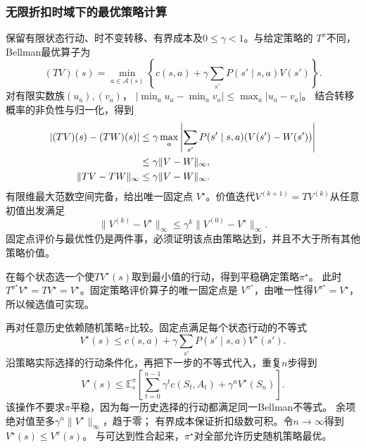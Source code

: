 \subsubsection{无限折扣时域下的最优策略计算}

保留有限状态行动、时不变转移、有界成本及$0\leq\gamma<1$。与给定策略的
$T^\pi$不同，Bellman最优算子为
\begin{equation}
  (TV)(s)=\min_{a\in\mathcal A(s)}
    \left\{c(s,a)+\gamma\sum_{s'}P(s'\mid s,a)V(s')\right\}.
  \label{eq:decision-discounted-bellman-operator}
\end{equation}
对有限实数族$(u_a),(v_a)$，
$|\min_a u_a-\min_a v_a|\leq\max_a|u_a-v_a|$。
结合转移概率的非负性与归一化，得到
\begin{align}
  |(TV)(s)-(TW)(s)|
  &\leq\gamma\max_a
    \left|\sum_{s'}P(s'\mid s,a)(V(s')-W(s'))\right|\notag\\
  &\leq\gamma\lVert V-W\rVert_\infty,
  \label{eq:decision-bellman-contraction-pointwise}\\
  \lVert TV-TW\rVert_\infty&\leq\gamma\lVert V-W\rVert_\infty.
  \label{eq:decision-bellman-contraction}
\end{align}
有限维最大范数空间完备，给出唯一固定点
$V^\star$。价值迭代$V^{(k+1)}=TV^{(k)}$从任意初值出发满足
\begin{equation}
  \lVert V^{(k)}-V^\star\rVert_\infty
  \leq\gamma^k\lVert V^{(0)}-V^\star\rVert_\infty.
  \label{eq:decision-value-iteration-error}
\end{equation}
固定点评价与最优性仍是两件事，必须证明该点由策略达到，并且不大于所有其他策略价值。

在每个状态选一个使$TV^\star(s)$取到最小值的行动，得到平稳确定策略$\pi^\star$。
此时$T^{\pi^\star}V^\star=TV^\star=V^\star$。固定策略评价算子的唯一固定点是
$V^{\pi^\star}$，由唯一性得$V^{\pi^\star}=V^\star$，所以候选值可实现。

再对任意历史依赖随机策略$\pi$比较。固定点满足每个状态行动的不等式
\[
  V^\star(s)\leq c(s,a)+\gamma\sum_{s'}P(s'\mid s,a)V^\star(s').
\]
沿策略实际选择的行动条件化，再把下一步的不等式代入，重复$n$步得到
\begin{equation}
  V^\star(s)\leq\mathbb E_s^\pi
  \left[\sum_{t=0}^{n-1}\gamma^tc(S_t,A_t)+\gamma^nV^\star(S_n)\right].
  \label{eq:decision-discounted-all-policy-comparison}
\end{equation}
该操作不要求$\pi$平稳，因为每一历史选择的行动都满足同一Bellman不等式。
余项绝对值至多$\gamma^n\lVert V^\star\rVert_\infty$，趋于零；
有界成本保证折扣级数可积。令$n\to\infty$得到$V^\star(s)\leq V^\pi(s)$。
与可达到性合起来，$\pi^\star$对全部允许历史随机策略最优。

